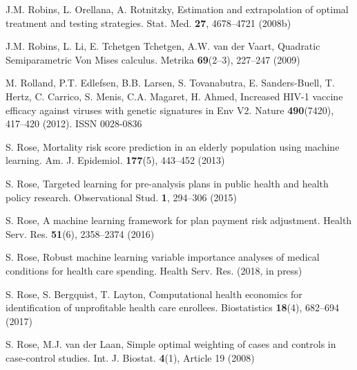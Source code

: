 \begin{list}{}{\setlength{\leftmargin}{2.1em}\setlength{\labelwidth}{0pt}
  \setlength{\labelsep}{0pt}\setlength{\itemindent}{-2.1em}
  \setlength{\parsep}{0pt}\setlength{\itemsep}{2pt}\setlength{\topsep}{0pt}}
\item\label{refentry:REF309}J.M. Robins, L. Orellana, A. Rotnitzky, Estimation and extrapolation of optimal treatment and testing strategies. Stat. Med. \textbf{27}, 4678--4721 (2008b)\label{refend:REF309}
\item\label{refentry:REF310}J.M. Robins, L. Li, E. Tchetgen Tchetgen, A.W. van der Vaart, Quadratic Semiparametric Von Mises calculus. Metrika \textbf{69}(2--3), 227--247 (2009)\label{refend:REF310}
\item\label{refentry:REF311}M. Rolland, P.T. Edlefsen, B.B. Larsen, S. Tovanabutra, E. Sanders-Buell, T. Hertz, C. Carrico, S. Menis, C.A. Magaret, H. Ahmed, Increased HIV-1 vaccine efficacy against viruses with genetic signatures in Env V2. Nature \textbf{490}(7420), 417--420 (2012). ISSN 0028-0836\label{refend:REF311}
\item\label{refentry:REF312}S. Rose, Mortality risk score prediction in an elderly population using machine learning. Am. J. Epidemiol. \textbf{177}(5), 443--452 (2013)\label{refend:REF312}
\item\label{refentry:REF313}S. Rose, Targeted learning for pre-analysis plans in public health and health policy research. Observational Stud. \textbf{1}, 294--306 (2015)\label{refend:REF313}
\item\label{refentry:REF314}S. Rose, A machine learning framework for plan payment risk adjustment. Health Serv. Res. \textbf{51}(6), 2358--2374 (2016)\label{refend:REF314}
\item\label{refentry:REF315}S. Rose, Robust machine learning variable importance analyses of medical conditions for health care spending. Health Serv. Res. (2018, in press)\label{refend:REF315}
\item\label{refentry:REF316}S. Rose, S. Bergquist, T. Layton, Computational health economics for identification of unprofitable health care enrollees. Biostatistics \textbf{18}(4), 682--694 (2017)\label{refend:REF316}
\item\label{refentry:REF317}S. Rose, M.J. van der Laan, Simple optimal weighting of cases and controls in case-control studies. Int. J. Biostat. \textbf{4}(1), Article 19 (2008)\label{refend:REF317}

\end{list}
